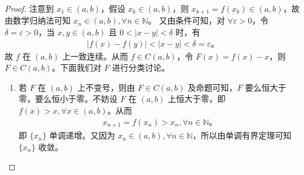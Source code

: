 \documentclass[lang=cn,newtx,10pt,scheme=chinese]{../Template/elegantbook}
\begin{document}
\begin{proof}
注意到 $x_1 \in (a, b)$，假设 $x_k \in (a, b)$，则 $x_{k+1} = f(x_k) \in (a, b)$，故由数学归纳法可知 $x_n \in (a, b), \forall n \in \mathbb{N}$。
又由条件可知，对 $\forall \varepsilon > 0$，令 $\delta = \varepsilon > 0$，当 $x, y \in (a, b)$ 且 $0 < |x - y| < \delta$ 时，有
\begin{align*}
|f(x) - f(y)| < |x - y| < \delta = \varepsilon。
\end{align*}
故 $f$ 在 $(a, b)$ 上一致连续。从而 $f \in C(a, b)$，令 $F(x) = f(x) - x$，则 $F \in C(a, b)$。下面我们对 $F$ 进行分类讨论。

\begin{enumerate}[(1)]
\item 若 $F$ 在 $(a, b)$ 上不变号，则由 $F \in C(a, b)$ 及命题可知，$F$ 要么恒大于零，要么恒小于零。不妨设 $F$ 在 $(a, b)$ 上恒大于零，即 $f(x) > x, \forall x \in (a, b)$。从而
\begin{align*}
x_{n+1} = f(x_n) > x_n, \forall n \in \mathbb{N}。
\end{align*}
即 $\{x_n\}$ 单调递增。又因为 $x_n \in (a, b), \forall n \in \mathbb{N}$，所以由单调有界定理可知 $\{x_n\}$ 收敛。


\end{enumerate}
\end{proof}
\end{document}
